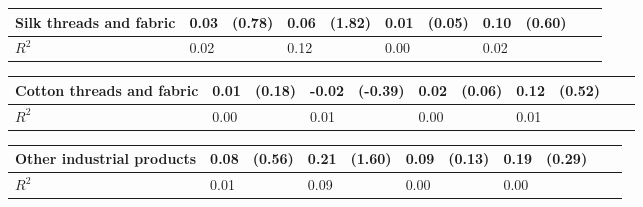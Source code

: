 \def\sym#1{\ifmmode^{#1}\else\(^{#1}\)\fi}
\begin{tabular}{p{4cm} p{1.4cm} p{1.2cm} p{1.5cm}  p{1.5cm} p{1.4cm} p{1.2cm} p{1.5cm} p{1.5cm}  p{1.5cm} p{1.5cm} }
\hline
Silk threads and fabric&     0.03         &   (0.78)&     0.06         &   (1.82)&     0.01         &   (0.05)&     0.10         &   (0.60)\\
\hline
\(R^{2}\)       &     0.02         &         &     0.12         &         &     0.00         &         &     0.02         &         \\
\end{tabular}
\def\sym#1{\ifmmode^{#1}\else\(^{#1}\)\fi}
\begin{tabular}{p{4cm} p{1.4cm} p{1.2cm} p{1.5cm}  p{1.5cm} p{1.4cm} p{1.2cm} p{1.5cm} p{1.5cm}  p{1.5cm} p{1.5cm} }
\hline
Cotton threads and fabric&     0.01         &   (0.18)&    -0.02         &  (-0.39)&     0.02         &   (0.06)&     0.12         &   (0.52)\\
\hline
\(R^{2}\)       &     0.00         &         &     0.01         &         &     0.00         &         &     0.01         &         \\
\end{tabular}
\def\sym#1{\ifmmode^{#1}\else\(^{#1}\)\fi}
\begin{tabular}{p{4cm} p{1.4cm} p{1.2cm} p{1.5cm}  p{1.5cm} p{1.4cm} p{1.2cm} p{1.5cm} p{1.5cm}  p{1.5cm} p{1.5cm} }
\hline
Other industrial products&     0.08         &   (0.56)&     0.21         &   (1.60)&     0.09         &   (0.13)&     0.19         &   (0.29)\\
\hline
\(R^{2}\)       &     0.01         &         &     0.09         &         &     0.00         &         &     0.00         &         \\
\end{tabular}
